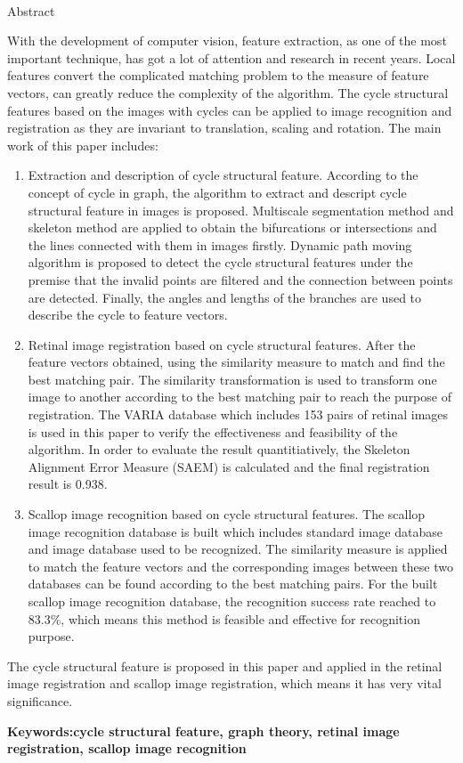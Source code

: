 \newpage
\mbox{}
\newpage
\begin{center}
  {\sanhao[1.5]\heiti\oucetitle\\\vskip7pt Abstract}
\end{center}
{\normalsize\songti
With the development of computer vision, feature extraction, as one of the most important technique, has got a lot of attention and research in recent years. Local features convert the complicated matching problem to the measure of feature vectors, can greatly reduce the complexity of the algorithm. The cycle structural features based on the images with cycles can be applied to image recognition and registration as they are invariant to translation, scaling and rotation. The main work of this paper includes:

\begin{enumerate}
\item Extraction and description of cycle structural feature. According to the concept of cycle in graph, the algorithm to extract and descript cycle structural feature in images is proposed. Multiscale segmentation method and skeleton method are applied to obtain the bifurcations or intersections and the lines connected with them in images firstly. Dynamic path moving algorithm is proposed to detect the cycle structural features under the premise that the invalid points are filtered and the connection between points are detected. Finally, the angles and lengths of the branches are used to describe the cycle to feature vectors. 
\item Retinal image registration based on cycle structural features. After the feature vectors obtained, using the similarity measure to match and find the best matching pair. The similarity transformation is used to transform one image to another according to the best matching pair to reach the purpose of registration. The VARIA database which includes 153 pairs of retinal images is used in this paper to verify the effectiveness and feasibility of the algorithm.
In order to evaluate the result quantitiatively, the Skeleton Alignment Error Measure (SAEM) is calculated and the final registration result is 0.938.
\item Scallop image recognition based on cycle structural features. The scallop image recognition database is built which includes standard image database and image database used to be recognized. The similarity measure is applied to match the feature vectors and the corresponding images between these two databases can be found according to the best matching pairs. For the built scallop image recognition database, the recognition success rate reached to 83.3\%, which means this method is feasible and effective for recognition purpose.
\end{enumerate}  	
The cycle structural feature is proposed in this paper and applied in the retinal image registration and scallop image registration, which means it has very vital significance.
   
}
\vskip12bp
{\xiaosi\heiti\noindent 
\textbf{Keywords:\enskip cycle structural feature, graph theory, retinal image registration, scallop image recognition}}
